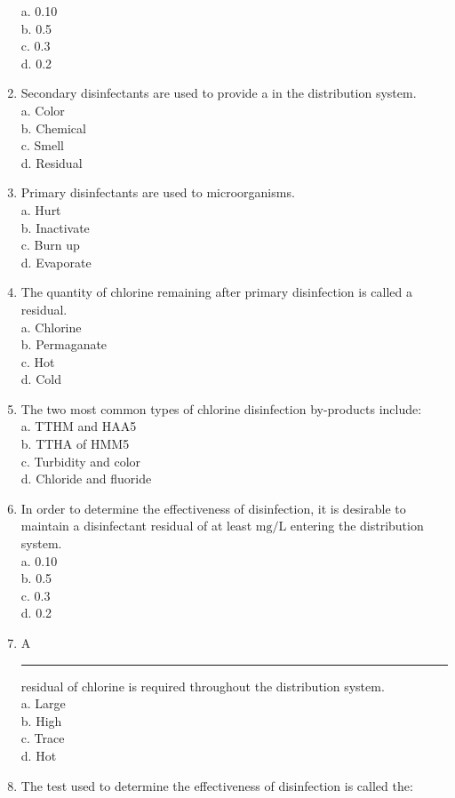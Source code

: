 \begin{enumerate}[1.]
a. 0.10\\
b. 0.5\\
c. 0.3\\
d. 0.2\\
\item Secondary disinfectants are used to provide a in the distribution system.\\
a. Color\\
b. Chemical\\
c. Smell\\
d. Residual\\
\item Primary disinfectants are used to microorganisms.\\
a. Hurt\\
b. Inactivate\\
c. Burn up\\
d. Evaporate\\
\item The quantity of chlorine remaining after primary disinfection is called a residual.\\
a. Chlorine\\
b. Permaganate\\
c. Hot\\
d. Cold\\
\item The two most common types of chlorine disinfection by-products include:\\
a. TTHM and HAA5\\
b. TTHA of HMM5\\
c. Turbidity and color\\
d. Chloride and fluoride\\
\item In order to determine the effectiveness of disinfection, it is desirable to maintain a disinfectant residual of at least $\mathrm{mg} / \mathrm{L}$ entering the distribution system.\\
a. 0.10\\
b. 0.5\\
c. 0.3\\
d. 0.2\\
\item A \rule{1.5cm}{0.5pt} residual of chlorine is required throughout the distribution system.\\
a. Large\\
b. High\\
c. Trace\\
d. Hot\\
\item The test used to determine the effectiveness of disinfection is called the:\\

\end{enumerate}
